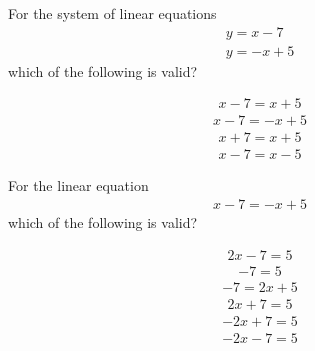 \documentclass{webquiz}
\begin{document}
\begin{question} %
For the system of linear equations
\begin{gather*} 
y=x-7\\
y=-x+5
\end{gather*}
which of the following is valid?
\begin{choice}[columns=2] %
\incorrect
\begin{gather*} 
x-7=x+5
\end{gather*}
\correct
\begin{gather*} 
x-7=-x+5
\end{gather*}
\incorrect
\begin{gather*} 
x+7=x+5
\end{gather*}
\incorrect
\begin{gather*} 
x-7=x-5
\end{gather*}
\end{choice}
\end{question}



\begin{question} %
For the linear equation
\begin{gather*} 
x-7=-x+5
\end{gather*}
which of the following is valid?
\begin{choice}[columns=2] %
\correct
\begin{gather*} 
2x-7=5
\end{gather*}
\incorrect
\begin{gather*} 
-7=5
\end{gather*}
\incorrect
\begin{gather*} 
-7=2x+5
\end{gather*}
\incorrect
\begin{gather*} 
2x+7=5
\end{gather*}
\incorrect
\begin{gather*} 
-2x+7=5
\end{gather*}
\incorrect
\begin{gather*} 
-2x-7=5
\end{gather*}
\end{choice}
\end{question}
\end{document}

